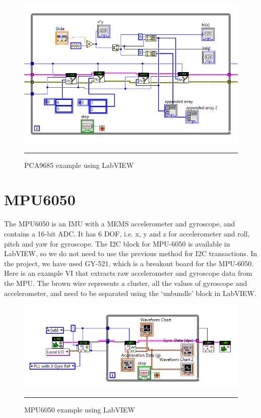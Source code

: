 \begin{figure}[htbp]
	\centering
		\includegraphics[width = 5in]{./Figures/PCA-9685.png}
		\rule{35em}{0.5pt}
	\caption{PCA9685 example using LabVIEW}
	\label{fig:PCA9685 example using LabVIEW}
\end{figure}



\section{MPU6050}
The MPU6050 is an IMU with a MEMS accelerometer and gyroscope, and contains a 16-bit ADC. It has 6 DOF, i.e. x, y and z for accelerometer and roll, pitch and yaw for gyroscope. The I2C block for MPU-6050 is available in LabVIEW, so we do not need to use the previous method for I2C transactions. In the project, we have used GY-521, which is a breakout board for the MPU-6050. Here is an example VI that extracts raw accelerometer and gyroscope data from the MPU. The brown wire represents a cluster, all the values of gyroscope and accelerometer, and need to be separated using the ‘unbundle’ block in LabVIEW.


\begin{figure}[htbp]
	\centering
		\includegraphics[width = 6in]{./Figures/MPU-6050.png}
		\rule{35em}{0.5pt}
	\caption{MPU6050 example using LabVIEW}
	\label{fig:MPU6050 example using LabVIEW}
\end{figure}